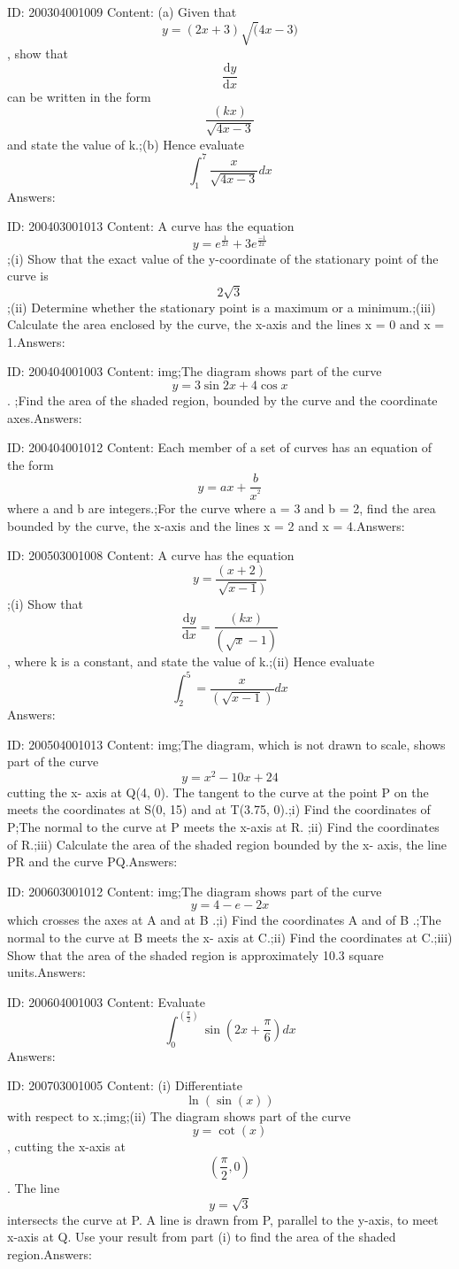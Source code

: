\documentclass{article}
\begin{document}
ID: 200304001009
Content:
(a)	Given that $$y=(2x+3)\sqrt(4x-3)$$, show that $$ \frac{\mathrm{d} y}{\mathrm{d} x}$$ can be written in the form $$\frac{(kx)}{\sqrt{4x-3}}$$ and state the value of k.;(b)	Hence evaluate $$\int_1^7 \frac{x}{\sqrt{4x-3}}dx$$Answers:

ID: 200403001013
Content:
A curve has the equation $$y=e^{\frac{1}{2x}}+3e^{\frac{-1}{2x}}$$;(i)	Show that the exact value of the y-coordinate of the stationary point of the curve is $$2\sqrt3$$;(ii)	Determine whether the stationary point is a maximum or a minimum.;(iii)	Calculate the area enclosed by the curve, the x-axis and the lines x = 0 and x = 1.Answers:

ID: 200404001003
Content:
img;The diagram shows part of the curve $$y = 3 \sin  2x + 4 \cos  x$$. ;Find the area of the shaded region, bounded by the curve and the coordinate axes.Answers:

ID: 200404001012
Content:
Each member of a set of curves has an equation of the form $$y=ax+\frac{b}{x^{^{2}}}$$ where a and b are integers.;For the curve where a = 3 and b = 2, find the area bounded by the curve, the x-axis and the lines x = 2 and x = 4.Answers:

ID: 200503001008
Content:
A curve has the equation $$y=\frac{(x+2)}{\sqrt{x-1})}$$;(i)	Show that $$\frac{\mathrm{d} y}{\mathrm{d} x}=\frac{(kx)}{(\sqrt x-1)}$$, where k is a constant, and state the value of k.;(ii)	Hence evaluate $$\int_2^5=\frac{x}{(\sqrt{x-1})}dx$$Answers:

ID: 200504001013
Content:
img;The diagram, which is not drawn to scale, shows part of the curve $$y=x^2-10x+24$$ cutting the x- axis at Q(4, 0). The tangent to the curve at the point P on the meets the coordinates at S(0, 15) and at T(3.75, 0).;i) Find the coordinates of P;The normal to the curve at P meets the x-axis at R. ;ii) Find the coordinates of R.;iii) Calculate the area of the shaded region bounded by the x- axis, the line PR and the curve PQ.Answers:

ID: 200603001012
Content:
img;The diagram shows part of the curve $$y = 4 - e-2x$$ which crosses the axes at A and at B .;i) Find the coordinates A and of B .;The normal to the curve at B meets the x- axis at C.;ii) Find the coordinates at C.;iii) Show that the area of the shaded region is approximately 10.3 square units.Answers:

ID: 200604001003
Content:
Evaluate $$\int_0^{( \frac{\pi}{2})}\sin (2x+ \frac{\pi}{6})dx$$Answers:

ID: 200703001005
Content:
(i) Differentiate $$\ln(\sin (x))$$with respect to x.;img;(ii) The diagram shows part of the curve $$y=\cot (x)$$, cutting the x-axis at$$(\frac{\pi}{2}, 0)$$. The line $$y=\sqrt3$$ intersects the curve at P. A line is drawn from P, parallel to the y-axis, to meet x-axis at Q. Use your result from part (i) to find the area of the shaded region.Answers:
\end{document}
